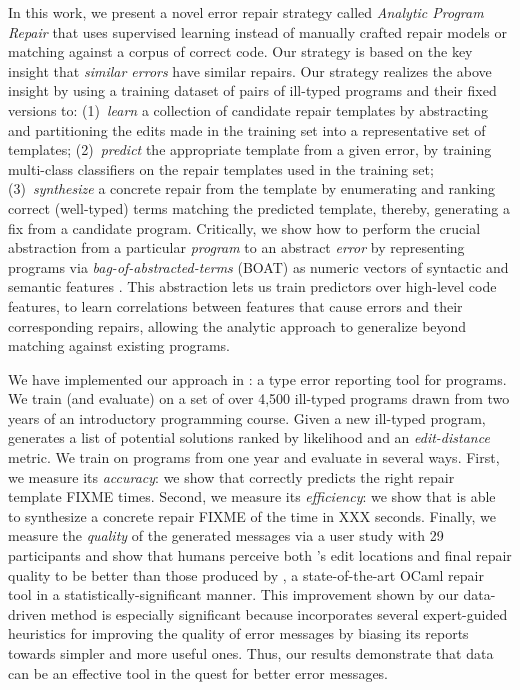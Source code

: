 %
In this work, we present a novel error repair
strategy called \emph{Analytic Program Repair}
that uses supervised learning instead of manually
crafted repair models or matching against a corpus
of correct code.
%
Our strategy is based on the key insight that
\emph{similar errors} have similar repairs.
%
Our strategy realizes the above insight by using
a training dataset of pairs of ill-typed programs
and their fixed versions to:
%
(1)~\emph{learn} a collection of candidate repair templates
    by abstracting and partitioning the edits made in the
    training set into a representative set of templates;
%
(2)~\emph{predict} the appropriate template from a given error,
    by training multi-class classifiers on the repair templates
    used in the training set;
%
(3)~\emph{synthesize} a concrete repair from the template
   by enumerating and ranking correct (\eg well-typed)
   terms matching the predicted template,
%
thereby, generating a fix from a candidate program.
%
Critically, we show how to perform the crucial abstraction
from a particular \emph{program} to an abstract \emph{error}
by representing programs via \emph{bag-of-abstracted-terms} (BOAT)
\ie as numeric vectors of syntactic and semantic features \citep{Seidel2017-ko}.
%
This abstraction lets us train predictors over high-level
code features, \ie to learn correlations between features
that cause errors and their corresponding repairs, allowing
the analytic approach to generalize beyond matching against
existing programs.

\mypara{\toolname}
%
We have implemented our approach in \toolname: a type error reporting
tool for \ocaml programs. We train (and evaluate) \toolname on a set of
over 4,500 ill-typed \ocaml programs drawn from two years of an
introductory programming course.
%
Given a new ill-typed program, \toolname generates a list of potential
solutions ranked by likelihood and an \emph{edit-distance} metric.
We train \toolname on programs from one year and evaluate in several
ways.
%
First, we measure its \emph{accuracy}: we show that \toolname correctly
predicts the right repair template {FIXME} times.
%
Second, we measure its \emph{efficiency}: we show that \toolname is able
to synthesize a concrete repair {FIXME} of the time in XXX seconds.
%
Finally, we measure the \emph{quality} of the generated messages via
a user study with 29 participants and show that
humans perceive both \toolname's edit locations and final repair quality
to be better than those produced by \seminal, a state-of-the-art OCaml
repair tool \citep{Lerner2007-dt} in a statistically-significant manner.
%
This improvement shown by our data-driven method is especially
significant because \seminal incorporates several expert-guided
heuristics for improving the quality of error messages by biasing
its reports towards simpler and more useful ones.
%
Thus, our results demonstrate that data can be an 
effective tool in the quest for better error messages.


